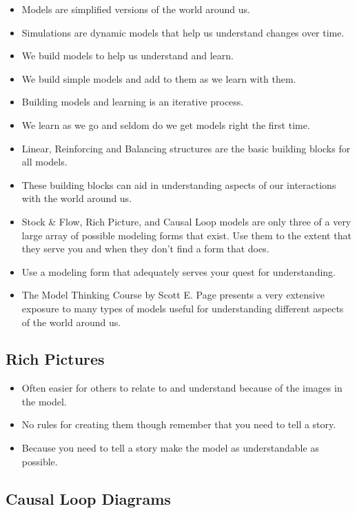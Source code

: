 \documentclass[]{memoir}
\begin{document}
\begin{itemize}
\itemsep1pt\parskip0pt
\item
  Models are simplified versions of the world around us.
\item
  Simulations are dynamic models that help us understand changes over
  time.
\item
  We build models to help us understand and learn.
\item
  We build simple models and add to them as we learn with them.
\item
  Building models and learning is an iterative process.
\item
  We learn as we go and seldom do we get models right the first time.
\item
  Linear, Reinforcing and Balancing structures are the basic building
  blocks for all models.
\item
  These building blocks can aid in understanding aspects of our
  interactions with the world around us.
\item
  Stock \& Flow, Rich Picture, and Causal Loop models are only three of
  a very large array of possible modeling forms that exist. Use them to
  the extent that they serve you and when they don't find a form that
  does.
\item
  Use a modeling form that adequately serves your quest for
  understanding.
\item
  The Model Thinking Course by Scott E. Page presents a very extensive
  exposure to many types of models useful for understanding different
  aspects of the world around us.
\end{itemize}

\subsection{Rich Pictures}

\begin{itemize}
\itemsep1pt\parskip0pt
\item
  Often easier for others to relate to and understand because of the
  images in the model.
\item
  No rules for creating them though remember that you need to tell a
  story.
\item
  Because you need to tell a story make the model as understandable as
  possible.
\end{itemize}

\subsection{Causal Loop Diagrams}
\end{document}
